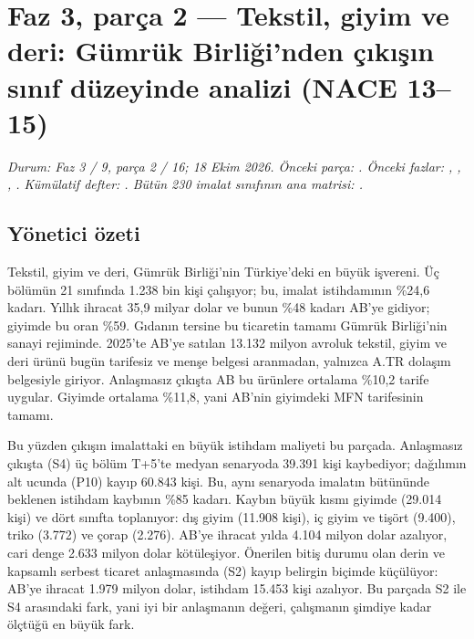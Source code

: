 \hypertarget{nace_kartlar_13-15}{%
\chapter{Faz 3, parça 2 --- Tekstil, giyim ve deri: Gümrük Birliği'nden çıkışın sınıf düzeyinde analizi (NACE 13--15)}\label{nace_kartlar_13-15}}

\emph{Durum: Faz 3 / 9, parça 2 / 16; 18 Ekim 2026. Önceki parça: . Önceki fazlar: , , , . Kümülatif defter: . Bütün 230 imalat sınıfının ana matrisi: \href{../veri/nace_matris.csv}{}.}

\hypertarget{nace_kartlar_13-15-yuxf6netici-uxf6zeti}{%
\section{Yönetici özeti}\label{nace_kartlar_13-15-yuxf6netici-uxf6zeti}}

Tekstil, giyim ve deri, Gümrük Birliği'nin Türkiye'deki en büyük işvereni. Üç bölümün 21 sınıfında 1.238 bin kişi çalışıyor; bu, imalat istihdamının \%24,6 kadarı. Yıllık ihracat 35,9 milyar dolar ve bunun \%48 kadarı AB'ye gidiyor; giyimde bu oran \%59. Gıdanın tersine bu ticaretin tamamı Gümrük Birliği'nin sanayi rejiminde. 2025'te AB'ye satılan 13.132 milyon avroluk tekstil, giyim ve deri ürünü bugün tarifesiz ve menşe belgesi aranmadan, yalnızca A.TR dolaşım belgesiyle giriyor. Anlaşmasız çıkışta AB bu ürünlere ortalama \%10,2 tarife uygular. Giyimde ortalama \%11,8, yani AB'nin giyimdeki MFN tarifesinin tamamı.

Bu yüzden çıkışın imalattaki en büyük istihdam maliyeti bu parçada. Anlaşmasız çıkışta (S4) üç bölüm T+5'te medyan senaryoda 39.391 kişi kaybediyor; dağılımın alt ucunda (P10) kayıp 60.843 kişi. Bu, aynı senaryoda imalatın bütününde beklenen istihdam kaybının \%85 kadarı. Kaybın büyük kısmı giyimde (29.014 kişi) ve dört sınıfta toplanıyor: dış giyim (11.908 kişi), iç giyim ve tişört (9.400), triko (3.772) ve çorap (2.276). AB'ye ihracat yılda 4.104 milyon dolar azalıyor, cari denge 2.633 milyon dolar kötüleşiyor. Önerilen bitiş durumu olan derin ve kapsamlı serbest ticaret anlaşmasında (S2) kayıp belirgin biçimde küçülüyor: AB'ye ihracat 1.979 milyon dolar, istihdam 15.453 kişi azalıyor. Bu parçada S2 ile S4 arasındaki fark, yani iyi bir anlaşmanın değeri, çalışmanın şimdiye kadar ölçtüğü en büyük fark.

